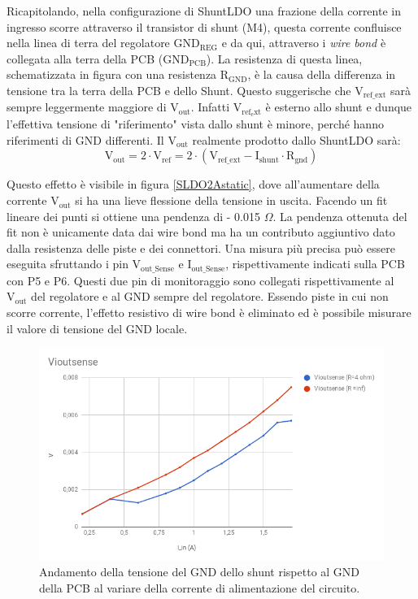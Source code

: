Ricapitolando, nella configurazione di ShuntLDO una frazione della corrente in ingresso scorre attraverso il transistor di shunt (M4), questa corrente confluisce nella linea di terra del regolatore $\mathrm{GND_{REG}}$ e da qui, attraverso i \textit{wire bond} è collegata alla terra della PCB ($\mathrm{GND_{PCB}}$). 
La resistenza di questa linea, schematizzata in figura con una resistenza $\mathrm{R_{GND}}$, è la causa della differenza in tensione tra la terra della PCB e dello Shunt. 
Questo suggerische che $\mathrm{V_{ref {\_} ext}}$ sarà sempre leggermente maggiore di $\mathrm{V_{out}}$. 
Infatti  $\mathrm{V_{ref_ext}}$ è esterno allo shunt e dunque l'effettiva tensione di "riferimento" vista dallo shunt è minore, perché hanno riferimenti di GND differenti. Il $\mathrm{V_{out}}$ realmente prodotto dallo ShuntLDO sarà:
\begin{equation}
\mathrm{V_{out} = 2 \cdot V_{ref} = 2 \cdot ( V_{ref {\_} ext} - I_{shunt} \cdot R_{gnd} )}
\end{equation}

Questo effetto è visibile in figura \ref{SLDO2Astatic}, dove all'aumentare della corrente $\mathrm{V_{out}}$ si ha una lieve flessione della tensione in uscita. Facendo un fit lineare dei punti si ottiene una pendenza di - 0.015 $\Omega$. 
La pendenza ottenuta del fit non è unicamente data dai wire bond ma ha un contributo aggiuntivo dato dalla resistenza delle piste e dei connettori. 
Una misura più precisa può essere eseguita sfruttando i pin $\mathrm{V_{out{\_}Sense}}$ e $\mathrm{I_{out {\_} Sense}}$, rispettivamente indicati sulla PCB con P5 e P6. 
Questi due pin di monitoraggio sono collegati rispettivamente al $\mathrm{V_{out}}$ del regolatore e al GND sempre del regolatore. 
Essendo piste in cui non scorre corrente, l'effetto resistivo di wire bond è eliminato ed è possibile misurare il valore di tensione del GND locale.

\begin{figure}
\centering
\includegraphics[scale=.4]{Immagini/Viout}
\caption{Andamento della tensione del GND dello shunt rispetto al GND della PCB al variare della corrente di alimentazione del circuito.}
\label{VioutSense}
\end{figure}


